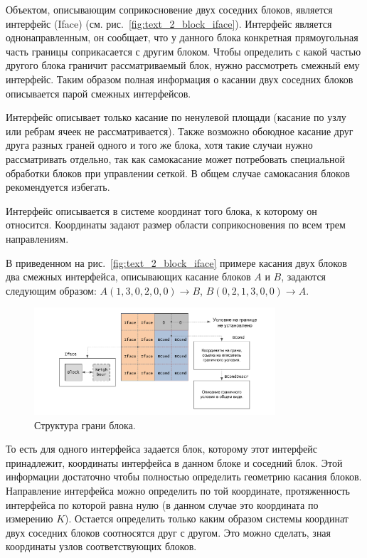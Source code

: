 Объектом, описывающим соприкосновение двух соседних блоков, является интерфейс (Iface) (см. рис.~\ref{fig:text_2_block_iface}).
Интерфейс является однонаправленным, он сообщает, что у данного блока конкретная прямоугольная часть границы соприкасается с другим блоком.
Чтобы определить с какой частью другого блока граничит рассматриваемый блок, нужно рассмотреть смежный ему интерфейс.
Таким образом полная информация о касании двух соседних блоков описывается парой смежных интерфейсов.

Интерфейс описывает только касание по ненулевой площади (касание по узлу или ребрам ячеек не рассматривается).
Также возможно обоюдное касание друг друга разных граней одного и того же блока, хотя такие случаи нужно рассматривать отдельно, так как самокасание может потребовать специальной обработки блоков при управлении сеткой.
В общем случае самокасания блоков рекомендуется избегать.

Интерфейс описывается в системе координат того блока, к которому он относится.
Координаты задают размер области соприкосновения по всем трем направлениям.

В приведенном на рис.~\ref{fig:text_2_block_iface} примере касания двух блоков два смежных интерфейса, описывающих касание блоков $A$ и $B$, задаются следующим образом: $A(1, 3, 0, 2, 0, 0) \rightarrow B$, $B(0, 2, 1, 3, 0, 0) \rightarrow A$.

\begin{figure}[ht]
\centering
\includegraphics[width=0.8\textwidth]{fig/par_8-facet.pdf}
\singlespacing
{}\caption{Структура грани блока.}
\label{fig:text_2_block_facet}
\end{figure}

То есть для одного интерфейса задается блок, которому этот интерфейс принадлежит, координаты интерфейса в данном блоке и соседний блок.
Этой информации достаточно чтобы полностью определить геометрию касания блоков.
Направление интерфейса можно определить по той координате, протяженность интерфейса по которой равна нулю (в данном случае это координата по измерению $K$).
Остается определить только каким образом системы координат двух соседних блоков соотносятся друг с другом.
Это можно сделать, зная координаты узлов соответствующих блоков.

